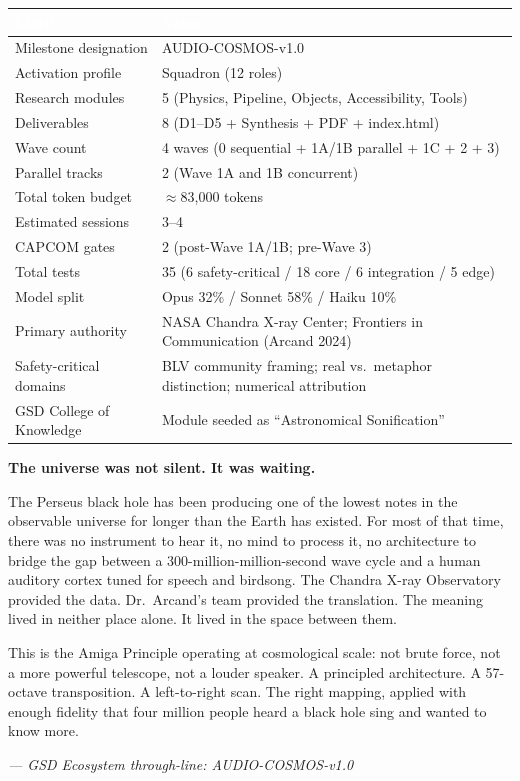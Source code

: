 \documentclass[11pt,letterpaper]{article}
\newcommand{\tableheader}[1]{\textbf{\sffamily\textcolor{white}{#1}}}
\begin{document}
\begin{center}
\begin{tabularx}{\textwidth}{L{5cm}X}
\toprule
{}
\tableheader{Metric} & \tableheader{Value} \\
\midrule
Milestone designation & AUDIO-COSMOS-v1.0 \\
Activation profile & Squadron (12 roles) \\
Research modules & 5 (Physics, Pipeline, Objects, Accessibility, Tools) \\
Deliverables & 8 (D1--D5 + Synthesis + PDF + index.html) \\
Wave count & 4 waves (0 sequential + 1A/1B parallel + 1C + 2 + 3) \\
Parallel tracks & 2 (Wave 1A and 1B concurrent) \\
Total token budget & $\approx$83,000 tokens \\
Estimated sessions & 3--4 \\
CAPCOM gates & 2 (post-Wave 1A/1B; pre-Wave 3) \\
Total tests & 35 (6 safety-critical / 18 core / 6 integration / 5 edge) \\
Model split & Opus 32\% / Sonnet 58\% / Haiku 10\% \\
Primary authority & NASA Chandra X-ray Center; Frontiers in Communication (Arcand 2024) \\
Safety-critical domains & BLV community framing; real vs.\ metaphor distinction; numerical attribution \\
GSD College of Knowledge & Module seeded as ``Astronomical Sonification'' \\
\bottomrule
\end{tabularx}
\end{center}

\vspace{2em}
\begin{quotebox}
\textbf{\sffamily\large The universe was not silent. It was waiting.}

\vspace{0.5em}
The Perseus black hole has been producing one of the lowest notes in the observable universe for longer than the Earth has existed. For most of that time, there was no instrument to hear it, no mind to process it, no architecture to bridge the gap between a 300-million-million-second wave cycle and a human auditory cortex tuned for speech and birdsong. The Chandra X-ray Observatory provided the data. Dr.\ Arcand's team provided the translation. The meaning lived in neither place alone. It lived in the space between them.

This is the Amiga Principle operating at cosmological scale: not brute force, not a more powerful telescope, not a louder speaker. A principled architecture. A 57-octave transposition. A left-to-right scan. The right mapping, applied with enough fidelity that four million people heard a black hole sing and wanted to know more.

\vspace{0.5em}
\textit{--- GSD Ecosystem through-line: AUDIO-COSMOS-v1.0}
\end{quotebox}
\end{document}

